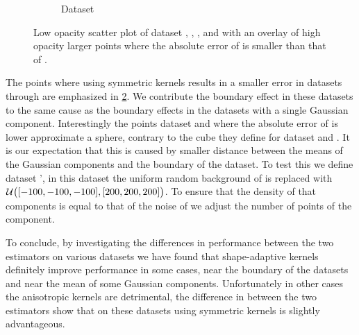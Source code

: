 \begin{figure}
\begin{subfigure}{0.23\textwidth}
			\caption{Dataset \baakmanThree}
			\label{fig:discussion:performance:mbeLowerError:baakman3}
		\end{subfigure}			
		\caption{Low opacity scatter plot of dataset %
			 \ferdosiTwo, %
			 \baakmanTwo, %
			 \ferdosiThree, and %
			 \baakmanThree %
			with an overlay of high opacity larger points where the absolute error of \mbe is smaller than that of \sambe.}
		\label{fig:discussion:performance:multisphere:mbeLowerError}
	\end{figure}	
	The points where using symmetric kernels results in a smaller error in datasets \ferdosiTwo through \baakmanThree are emphasized in
	\cref{fig:discussion:performance:multisphere:mbeLowerError}. We contribute the boundary effect in these datasets to the same cause as the boundary effects in the datasets with a single Gaussian component. Interestingly the points dataset \ferdosiThree and \baakmanThree where the absolute error of \mbe is lower approximate a sphere, contrary to the cube they define for dataset \ferdosiTwo and \baakmanTwo. It is our expectation that this is caused by smaller distance between the means of the Gaussian components and the boundary of the dataset. To test this we define dataset \ferdosiThree', in this dataset the uniform random background of \ferdosiThree is replaced with $\mathcal{U}\big([-100, -100, -100], [200, 200, 200]\big)$. To ensure that the density of that components is equal to that of the noise of \ferdosiThree we adjust the number of points of the component. 

To conclude, by investigating the differences in performance between the two estimators on various datasets we have found that shape-adaptive kernels definitely improve performance in some cases, \eg near the boundary of the datasets and near the mean of some Gaussian components. Unfortunately in other cases the anisotropic kernels are detrimental, the difference in \mse between the two estimators show that on these datasets using symmetric kernels is slightly advantageous. 